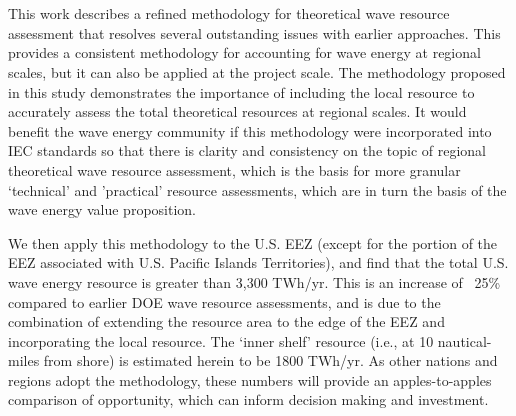 \section{\DIFdelbegin {}\DIFdelend \DIFaddbegin {}\DIFaddend }
\DIFdelbegin %
\DIFdelend 

This work describes a refined methodology for theoretical wave resource assessment that resolves several outstanding issues with earlier approaches. This provides a consistent methodology for accounting for wave energy at regional scales, but it can also be applied at the project scale. \DIFdelbegin {}\DIFdelend The methodology proposed in this study demonstrates the importance of including the local resource to accurately assess the total theoretical resources at regional scales. It would benefit the wave energy community if this methodology were incorporated into IEC standards so that there is clarity and consistency on the topic of regional theoretical wave resource assessment, which is the basis for more granular `technical' and 'practical' resource assessments, which are in turn the basis of the wave energy value proposition.

We then apply this methodology to the U.S. EEZ (except for the portion of the EEZ associated with U.S. Pacific Islands Territories), and find that the total U.S. wave energy resource is greater than 3,300 TWh/yr.
This is an increase of ~25\% compared to earlier DOE wave resource assessments, and is due to the combination of extending the resource area to the edge of the EEZ and incorporating the local resource. The `inner shelf' resource (i.e., at 10 nautical-miles from shore) is estimated herein to be 1800 TWh/yr.  As other nations and regions adopt the methodology, these numbers will provide an apples-to-apples comparison of opportunity, which can inform decision making and investment.



